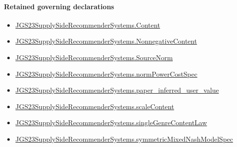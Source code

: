 \documentclass[10pt]{article}
\begin{document}
\paragraph{Retained governing declarations}
\begin{itemize}\raggedright
\item \hyperlink{governing-declaration-367305fda50f0ada}{JGS23\allowbreak{}Supply\allowbreak{}Side\allowbreak{}Recommender\allowbreak{}Systems.\allowbreak{}Content}
\item \hyperlink{governing-declaration-d426babe40b9593c}{JGS23\allowbreak{}Supply\allowbreak{}Side\allowbreak{}Recommender\allowbreak{}Systems.\allowbreak{}Nonnegative\allowbreak{}Content}
\item \hyperlink{governing-declaration-6141339a5d3412d9}{JGS23\allowbreak{}Supply\allowbreak{}Side\allowbreak{}Recommender\allowbreak{}Systems.\allowbreak{}Source\allowbreak{}Norm}
\item \hyperlink{governing-declaration-6ba13dc1cae95e6e}{JGS23\allowbreak{}Supply\allowbreak{}Side\allowbreak{}Recommender\allowbreak{}Systems.\allowbreak{}norm\allowbreak{}Power\allowbreak{}Cost\allowbreak{}Spec}
\item \hyperlink{governing-declaration-48347eafb3702717}{JGS23\allowbreak{}Supply\allowbreak{}Side\allowbreak{}Recommender\allowbreak{}Systems.\allowbreak{}paper\_\allowbreak{}inferred\_\allowbreak{}user\_\allowbreak{}value}
\item \hyperlink{governing-declaration-c0824fcccb145634}{JGS23\allowbreak{}Supply\allowbreak{}Side\allowbreak{}Recommender\allowbreak{}Systems.\allowbreak{}scale\allowbreak{}Content}
\item \hyperlink{governing-declaration-205216ea3d333b14}{JGS23\allowbreak{}Supply\allowbreak{}Side\allowbreak{}Recommender\allowbreak{}Systems.\allowbreak{}single\allowbreak{}Genre\allowbreak{}Content\allowbreak{}Law}
\item \hyperlink{paper-prerequisite-b412efba7deb757f}{JGS23\allowbreak{}Supply\allowbreak{}Side\allowbreak{}Recommender\allowbreak{}Systems.\allowbreak{}symmetric\allowbreak{}Mixed\allowbreak{}Nash\allowbreak{}Model\allowbreak{}Spec}
\end{itemize}
\end{document}
